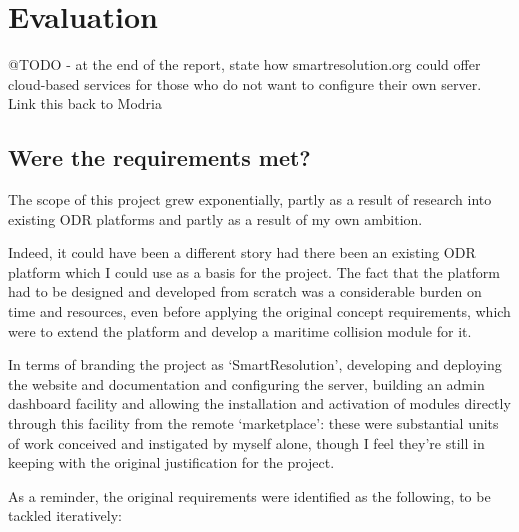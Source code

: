 \chapter{Evaluation}%

@TODO - at the end of the report, state how smartresolution.org could offer cloud-based services for those who do not want to configure their own server. Link this back to Modria

\section{Were the requirements met?}

The scope of this project grew exponentially, partly as a result of research into existing ODR platforms and partly as a result of my own ambition.

Indeed, it could have been a different story had there been an existing ODR platform which I could use as a basis for the project. The fact that the platform had to be designed and developed from scratch was a considerable burden on time and resources, even before applying the original concept requirements, which were to extend the platform and develop a maritime collision module for it.

In terms of branding the project as `SmartResolution', developing and deploying the website and documentation and configuring the server, building an admin dashboard facility and allowing the installation and activation of modules directly through this facility from the remote `marketplace': these were substantial units of work conceived and instigated by myself alone, though I feel they're still in keeping with the original justification for the project.

As a reminder, the original requirements were identified as the following, to be tackled iteratively:

